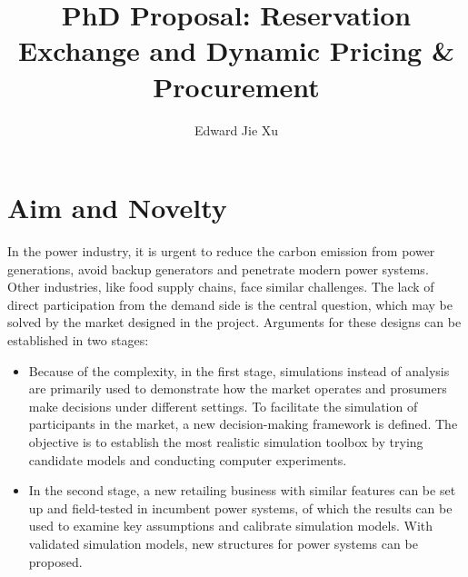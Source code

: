 \documentclass[letterpaper,8pt,twocolumn,twoside,]{pinp}
\title{PhD Proposal: Reservation Exchange and Dynamic Pricing \&
Procurement}
\author[a]{Edward Jie Xu}
\affil[a]{Department of Technology, Management and Economics,
Technical Univeristy of Denmark, Denmark}
\providecommand{\tightlist}{%
  \setlength{\itemsep}{0pt}\setlength{\parskip}{0pt}}
\begin{document}
\verticaladjustment{-2pt}

\maketitle
\thispagestyle{firststyle}



\hypertarget{aim-and-novelty}{%
\section{Aim and Novelty}\label{aim-and-novelty}}

In the power industry, it is urgent to reduce the carbon emission from
power generations, avoid backup generators and penetrate modern power
systems. Other industries, like food supply chains, face similar
challenges. The lack of direct participation from the demand side is the
central question, which may be solved by the market designed in the
project. Arguments for these designs can be established in two stages:

\begin{itemize}
\tightlist
\item
  Because of the complexity, in the first stage, simulations instead of
  analysis are primarily used to demonstrate how the market operates and
  prosumers make decisions under different settings. To facilitate the
  simulation of participants in the market, a new decision-making
  framework is defined. The objective is to establish the most realistic
  simulation toolbox by trying candidate models and conducting computer
  experiments.
\item
  In the second stage, a new retailing business with similar features
  can be set up and field-tested in incumbent power systems, of which
  the results can be used to examine key assumptions and calibrate
  simulation models. With validated simulation models, new structures
  for power systems can be proposed.
\end{itemize}
\end{document}
